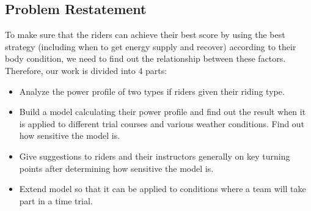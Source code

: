 \documentclass{article}
\begin{document}
		\subsection{Problem Restatement}
		To make sure that the riders can achieve their best score by using the best strategy (including when to get energy supply and recover) according  to their body condition, we need to find out the relationship between these factors. Therefore, our work is divided into 4 parts:
		\begin{itemize}
			\item  Analyze the power profile of two types if riders given their riding type.
			\item  Build a model calculating their power profile and find out the result when it is applied to different trial courses and various weather conditions. Find out how sensitive the model is.
			\item  Give suggestions to riders and their instructors generally on key turning points after determining how sensitive the model is.
			\item  Extend model so that it can be applied to conditions where a team will take part in a time trial.
		\end{itemize}
\end{document}
